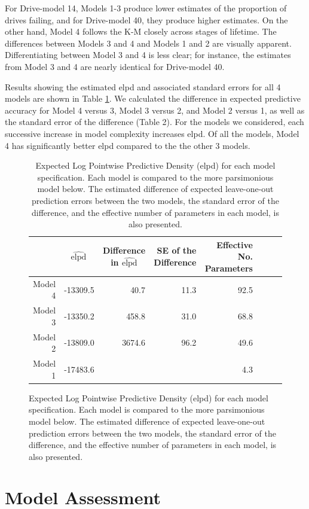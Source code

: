 \documentclass[12pt]{article}
\begin{document}
For Drive-model 14, Models 1-3 produce lower estimates of the proportion of drives failing, and for Drive-model 40, they produce higher estimates.  On the other hand, Model 4 follows the K-M closely across stages of lifetime.  The differences between Models 3 and 4 and Models 1 and 2 are visually apparent.  Differentiating between Model 3 and 4 is less clear; for instance, the estimates from Model 3 and 4 are nearly identical for Drive-model 40.


Results showing the estimated elpd and associated standard errors for all 4 models are shown in Table \ref{table:2}.
We calculated the difference in expected predictive accuracy for Model 4 versus 3, Model 3 versus 2, and Model 2 versus 1, as well as the standard error of the difference (Table 2). For the models we considered, each successive increase in model complexity increases elpd.  Of all the models, Model 4 has significantly better elpd compared to the the other 3 models.

\begin{figure}
\begin{table}[H]
\centering
\begin{tabular}{rrrrrrrr}
  \hline
 & $\widehat{\text{elpd}}$ \ & Difference in $\widehat{\text{elpd}}$ \ & SE of the Difference & Effective No. Parameters\\ 
  \hline
Model 4 & -13309.5 & 40.7 & 11.3 & 92.5 \\ 
Model 3 & -13350.2 & 458.8 & 31.0 & 68.8 \\ 
Model 2 & -13809.0 & 3674.6 & 96.2 & 49.6 \\ 
Model 1 & -17483.6 &  &  & 4.3 \\
   \hline
\end{tabular}
\caption{Expected Log Pointwise Predictive Density (elpd) for each model specification.  Each model is compared to the more parsimonious model below.  The estimated difference of expected leave-one-out prediction errors between the two models, the standard error of the difference, and the effective number of parameters in each model, is also presented.}
\label{table:2}
\end{table}
\end{figure}

\section{Model Assessment}
\end{document}
